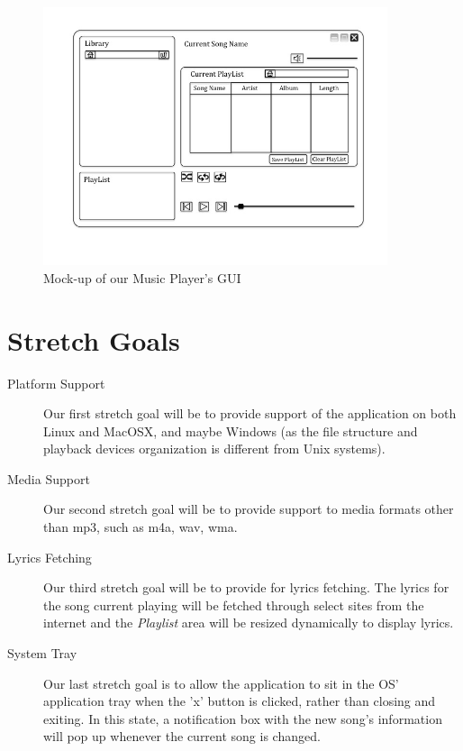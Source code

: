 \documentclass[12pt]{article}
\begin{document}
\begin{figure}[h]
    \centering
    \includegraphics[width=0.9\textwidth]{mockup.jpg}
    \caption{Mock-up of our Music Player's GUI}
\end{figure}

\section{Stretch Goals}

\begin{description}
    \item[Platform Support] Our first stretch goal will be to provide support of the application on both Linux and MacOSX, and maybe Windows (as the file structure and playback devices organization is different from Unix systems).
    \item[Media Support] Our second stretch goal will be to provide support to media formats other than mp3, such as m4a, wav, wma.
    \item[Lyrics Fetching] Our third stretch goal will be to provide for lyrics fetching. The lyrics for the song current playing will be fetched through select sites from the internet and the \emph{Playlist} area will be resized dynamically to display lyrics.
    \item[System Tray] Our last stretch goal is to allow the application to sit in the OS' application tray when the 'x' button is clicked, rather than closing and exiting. In this state, a notification box with the new song's information will pop up whenever the current song is changed.
\end{description}
\end{document}
